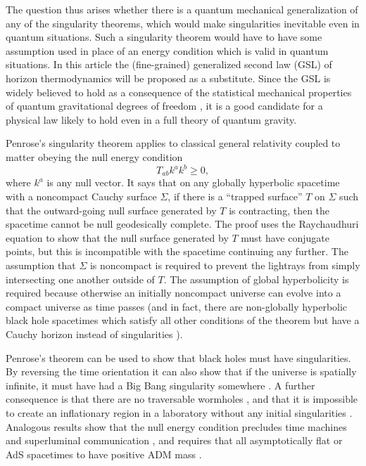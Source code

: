\documentclass[12pt]{article}
\begin{document}
The question thus arises whether there is a quantum mechanical generalization of any of the singularity theorems, which would make singularities inevitable even in quantum situations.  Such a singularity theorem would have to have some assumption used in place of an energy condition which is valid in quantum situations.  In this article the (fine-grained) generalized second law (GSL) of horizon thermodynamics will be proposed as a substitute.  Since the GSL is widely believed to hold as a consequence of the statistical mechanical properties of quantum gravitational degrees of freedom \cite{BHstat}, it is a good candidate for a physical law likely to hold even in a full theory of quantum gravity.

Penrose's singularity theorem \cite{HawkingEllis} applies to classical general relativity coupled to matter obeying the null energy condition
\begin{equation}\label{NEC}
T_{ab} k^a k^b \ge 0,
\end{equation}
where $k^a$ is any null vector.  It says that on any globally hyperbolic spacetime with a noncompact Cauchy surface $\Sigma$, if there is a ``trapped surface'' $T$ on $\Sigma$ such that the outward-going null surface generated by $T$ is contracting, then the spacetime cannot be null geodesically complete.  The proof uses the Raychaudhuri equation to show that the null surface generated by $T$ must have conjugate points, but this is incompatible with the spacetime continuing any further.  The assumption that $\Sigma$ is noncompact is required to prevent the lightrays from simply intersecting one another outside of $T$.  The assumption of global hyperbolicity is required because otherwise an initially noncompact universe can evolve into a compact universe as time passes (and in fact, there are non-globally hyperbolic black hole spacetimes which satisfy all other conditions of the theorem but have a Cauchy horizon instead of singularities \cite{HawkingEllis}).

Penrose's theorem can be used to show that black holes must have singularities.  By reversing the time orientation it can also show that if the universe is spatially infinite, it must have had a Big Bang singularity somewhere \cite{HawkingEllis}.  A further consequence is that there are no traversable wormholes \cite{worm}, and that it is impossible to create an inflationary region in a laboratory without any initial singularities \cite{obstacle}.  Analogous results show that the null energy condition precludes time machines \cite{noctc} and superluminal communication \cite{olum, supercensor, woolgar94, GW00}, and requires that all asymptotically flat or AdS spacetimes to have positive ADM mass \cite{SPW, woolgar94, GW00}.
\end{document}
